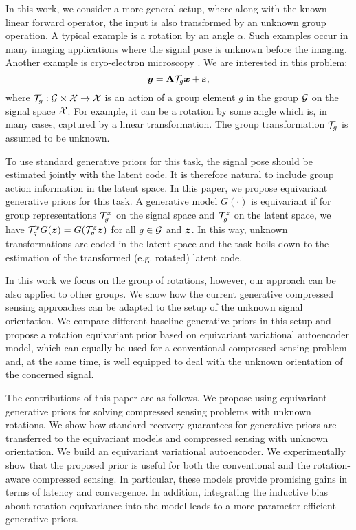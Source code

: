 In this work, we consider a more general setup, where along with the known linear forward operator, the input is also transformed by an unknown group operation. A typical example is a rotation by an angle $\alpha$. Such examples occur in many imaging applications where the signal pose is unknown before the imaging. Another example is cryo-electron microscopy \cite{singer_mathematics_2018}. We are interested in this problem: 
\begin{equation}
    {\bm{y}} = \mathbf{A} {\mathcal{T}}_g {\bm{x}}  + {\bm{\varepsilon}},
\end{equation}
where ${\mathcal{T}}_g: {\mathcal{G}} \times {\mathcal{X}} \rightarrow {\mathcal{X}} $ is an action of a group element $g$ in the group ${\mathcal{G}}$ on the signal space ${\mathcal{X}}$. For example, it can be a rotation by some angle which is, in many cases, captured by a linear transformation. The group transformation ${\mathcal{T}}_g$ is assumed to be unknown.

To use standard generative priors for this task, the signal pose should be estimated jointly with the latent code. It is therefore natural to include group action information in the latent space. In this paper, we propose equivariant generative priors for this task. A generative model $G(\cdot)$ is equivariant if for group representations ${\mathcal{T}}_g^x$ on the signal space and ${\mathcal{T}}_g^z$ on the latent space, we have ${\mathcal{T}}_g^xG({\bm{z}})=G({\mathcal{T}}_g^z {\bm{z}})$ for all $g\in{\mathcal{G}}$ and ${\bm{z}}$. In this way, unknown transformations are coded in the latent space and the task boils down to the estimation of the transformed (e.g. rotated) latent code. 


In this work we focus on the group of rotations, however, our approach can be also applied to other groups. 
We show how the current generative compressed sensing approaches can be adapted to the setup of the unknown signal orientation. We compare different baseline generative priors in this setup and propose a rotation equivariant prior based on equivariant variational autoencoder model, which can equally be used for a conventional compressed sensing problem and, at the same time, is well equipped to deal with the unknown orientation of the concerned signal. 

The contributions of this paper are as follows. We propose using equivariant generative priors for solving compressed sensing problems with unknown rotations. We show how standard recovery guarantees for generative priors are transferred to the equivariant models and compressed sensing with unknown orientation. We build an equivariant variational autoencoder. We experimentally show that the proposed prior is useful for both the conventional and the rotation-aware compressed sensing. In particular, these models provide promising gains in terms of latency and convergence. In addition, integrating the inductive bias about rotation equivariance into the model leads to a more parameter efficient generative priors.


